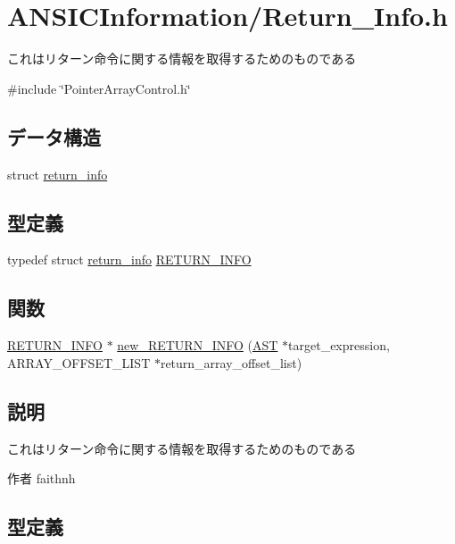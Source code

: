 \section{ANSICInformation/Return\_\-Info.h}
\label{Return__Info_8h}


これはリターン命令に関する情報を取得するためのものである  


{\ttfamily \#include \char`\"{}PointerArrayControl.h\char`\"{}}\par
\subsection*{データ構造}
\begin{DoxyCompactItemize}
\item 
struct \hyperlink{structreturn__info}{return\_\-info}
\end{DoxyCompactItemize}
\subsection*{型定義}
\begin{DoxyCompactItemize}
\item 
typedef struct \hyperlink{structreturn__info}{return\_\-info} \hyperlink{Return__Info_8h_a47fbc30788666354ae6600d608a8d551}{RETURN\_\-INFO}
\end{DoxyCompactItemize}
\subsection*{関数}
\begin{DoxyCompactItemize}
\item 
\hyperlink{structreturn__info}{RETURN\_\-INFO} $\ast$ \hyperlink{Return__Info_8h_a4830d2ad27d026fbb9e45ab93ceb221c}{new\_\-RETURN\_\-INFO} (\hyperlink{structabstract__syntax__tree}{AST} $\ast$target\_\-expression, ARRAY\_\-OFFSET\_\-LIST $\ast$return\_\-array\_\-offset\_\-list)
\end{DoxyCompactItemize}


\subsection{説明}
これはリターン命令に関する情報を取得するためのものである \begin{DoxyAuthor}{作者}
faithnh 
\end{DoxyAuthor}


\subsection{型定義}
